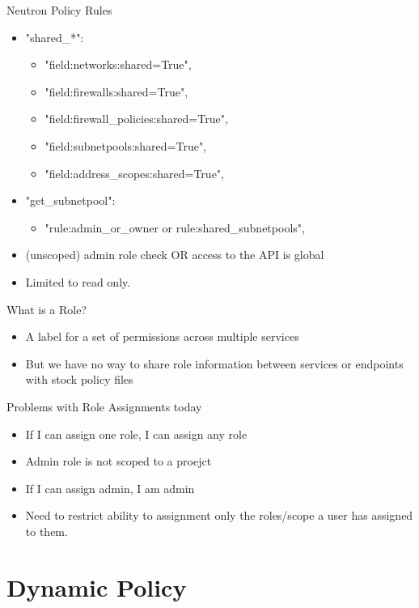 \documentclass{beamer}
\begin{document}
\begin{frame}Neutron Policy Rules{}
  \begin{itemize}
  \item "shared\_*":
    \begin{itemize}
    \item "field:networks:shared=True",
    \item "field:firewalls:shared=True",
    \item "field:firewall\_policies:shared=True",
    \item "field:subnetpools:shared=True",
    \item "field:address\_scopes:shared=True",
    \end{itemize}
  \item "get\_subnetpool":
    \begin{itemize}
    \item "rule:admin\_or\_owner or rule:shared\_subnetpools",
    \end{itemize}
  \item (unscoped) admin role check OR access to the API is global
  \item Limited to read only.
  \end{itemize}
\end{frame}

\begin{frame}What is a Role?{}
  \begin{itemize}
    \item A label for a set of permissions across multiple services
    \item But we have no way to share role information between services or endpoints with stock policy files
  \end{itemize}
\end{frame}

\begin{frame}{Problems with Role Assignments today}
  \begin{itemize}
  \item If I can assign one role, I can assign any role
  \item Admin role is not scoped to a proejct
  \item If I can assign admin, I am admin
  \item Need to restrict ability to assignment only the roles/scope a user has assigned to them.
  \end{itemize}
\end{frame}


\section {Dynamic Policy}
\end{document}
